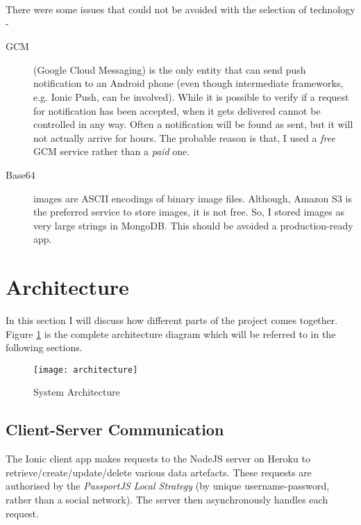 There were some issues that could not be avoided with the selection of technology - 

\begin{description}

	\item [GCM] (Google Cloud Messaging) \cite{gcm-site} is the only entity that can send push notification to an Android phone (even though intermediate frameworks, e.g. Ionic Push, can be involved). While it is possible to verify if a request for notification has been accepted, when it gets delivered cannot be controlled in any way. Often a notification will be found as sent, but it will not actually arrive for hours. The probable reason is that, I used a \textit{free} GCM service rather than a \textit{paid} one.
	
	\item [Base64] images \cite{base64-site} are ASCII encodings of binary image files. Although, Amazon S3 \cite{s3-site} is the preferred service to store images, it is not free. So, I stored images as very large strings in MongoDB. This should be avoided a production-ready app.
	
\end{description}



\section{Architecture}


In this section I will discuss how different parts of the project comes together. Figure \ref{fig:archi} is the complete architecture diagram which will be referred to in the following sections.

\begin{figure}[h]
    \centering
    \texttt{[image: architecture]}
    \caption{System Architecture}\label{fig:archi}
\end{figure}

\subsection{Client-Server Communication}

The Ionic client app makes requests to the NodeJS server on Heroku to retrieve/create/update/delete various data artefacts. These requests are authorised by the \textit{PassportJS Local Strategy} (by unique username-password, rather than a social network). The server then asynchronously handles each request.

